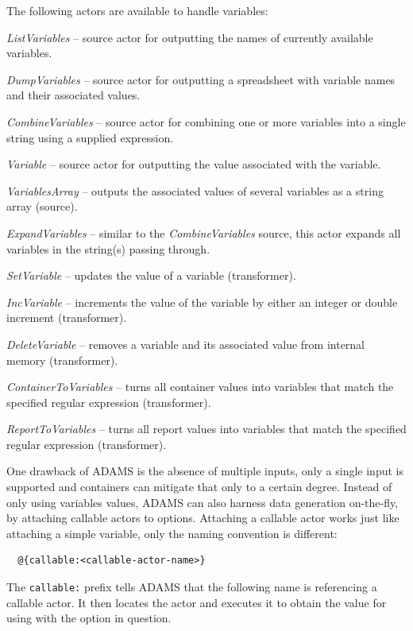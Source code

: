 The following actors are available to handle variables:
\begin{tight_itemize}
	\item \textit{ListVariables} -- source actor for outputting the names of 
	currently available variables.
	\item \textit{DumpVariables} -- source actor for outputting a spreadsheet with
	variable names and their associated values.
	\item \textit{CombineVariables} -- source actor for combining one or more
	variables into a single string using a supplied expression.
	\item \textit{Variable} -- source actor for outputting the value associated
	with the variable.
	\item \textit{VariablesArray} -- outputs the associated values of several
	variables as a string array (source).
	\item \textit{ExpandVariables} -- similar to the \textit{CombineVariables}
	source, this actor expands all variables in the string(s) passing through.
	\item \textit{SetVariable} -- updates the value of a variable (transformer).
	\item \textit{IncVariable} -- increments the value of the variable by either an
	integer or double increment (transformer).
	\item \textit{DeleteVariable} -- removes a variable and its associated value
	from internal memory (transformer).
	\item \textit{ContainerToVariables} -- turns all container values into variables
	that match the specified regular expression (transformer).
	\item \textit{ReportToVariables} -- turns all report values into variables
	that match the specified regular expression (transformer).
\end{tight_itemize}

One drawback of ADAMS is the absence of multiple inputs, only a single input is
supported and containers can mitigate that only to a certain degree. Instead of
only using variables values, ADAMS can also harness data generation on-the-fly,
by attaching callable actors to options. Attaching a callable actor works just like
attaching a simple variable, only the naming convention is different:
\begin{verbatim}
  @{callable:<callable-actor-name>}
\end{verbatim}
The \texttt{callable:} prefix tells ADAMS that the following name is referencing a
callable actor. It then locates the actor and executes it to obtain the value for
using with the option in question.

